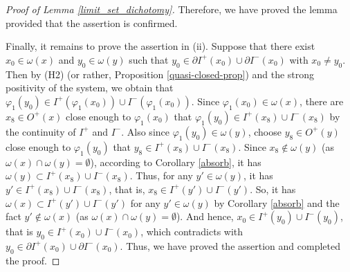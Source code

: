 \documentclass[10pt,a4paper]{amsart}
\begin{document}
\begin{proof}[Proof of Lemma \ref{limit_set_dichotomy}]
    Therefore, we have proved the lemma provided that the assertion is confirmed.
		
	Finally, it remains to prove the assertion in (ii). Suppose that there exist $x_{0}\in\omega(x)$ and $y_{0}\in\omega(y)$ such that $y_{0}\in \partial I^{+}(x_{0})\cup \partial I^{-}(x_{0})$ with $x_0\neq y_0$. 
    Then by (H2) (or rather, Proposition \ref{quasi-closed-prop}) and the strong positivity of the system, we obtain that $\varphi_1(y_{0})\in I^{+}(\varphi_1(x_{0}))\cup I^{-}(\varphi_1(x_{0}))$. Since $\varphi_1(x_{0})\in \omega(x)$, there are $x_8\in O^+(x)$ close enough to $\varphi_1(x_{0})$ that $\varphi_1(y_{0})\in I^{+}(x_8)\cup I^{-}(x_8)$ by the continuity of $I^{+}$ and $I^{-}$. 
    Also since $\varphi_1(y_{0})\in \omega(y)$, choose $y_8\in O^+(y)$ close enough to $\varphi_1(y_{0})$ that $y_8\in I^{+}(x_8)\cup I^{-}(x_8)$. Since $x_8\notin \omega(y)$ (as $\omega(x)\cap\omega(y)=\emptyset$), according to Corollary \ref{absorb}, it has $\omega(y)\subset I^{+}(x_8)\cup I^{-}(x_8)$. 
    Thus, for any $y'\in \omega(y)$, it has  $y'\in I^{+}(x_8)\cup I^{-}(x_8)$, that is, $x_8\in I^{+}(y')\cup I^{-}(y')$. 
    So, it has $\omega(x)\subset I^{+}(y')\cup I^{-}(y')$ for any $y'\in \omega(y)$ by Corollary \ref{absorb} and the fact $y'\notin\omega(x)$ (as $\omega(x)\cap\omega(y)=\emptyset$). And hence, $x_0\in I^{+}(y_0)\cup I^{-}(y_0)$, that is $y_0\in I^{+}(x_0)\cup I^{-}(x_0)$, which contradicts with $y_{0}\in\partial I^{+}(x_{0})\cup \partial I^{-}(x_{0})$. Thus, we have proved the assertion and completed the proof.
\end{proof}
\end{document}
